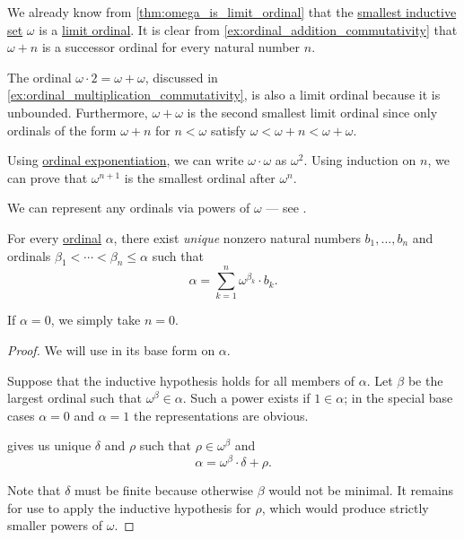 \begin{example}\label{ex:ordinal_polynomials}
  We already know from \cref{thm:omega_is_limit_ordinal} that the \hyperref[def:smallest_inductive_set]{smallest inductive set} \( \omega \) is a \hyperref[def:successor_and_limit_ordinal]{limit ordinal}. It is clear from \cref{ex:ordinal_addition_commutativity} that \( \omega + n \) is a successor ordinal for every natural number \( n \).

  The ordinal \( \omega \cdot 2 = \omega + \omega \), discussed in \cref{ex:ordinal_multiplication_commutativity}, is also a limit ordinal because it is unbounded. Furthermore, \( \omega + \omega \) is the second smallest limit ordinal since only ordinals of the form \( \omega + n \) for \( n < \omega \) satisfy \( \omega < \omega + n < \omega + \omega \).

  Using \hyperref[def:ordinal_exponentiation]{ordinal exponentiation}, we can write \( \omega \cdot \omega \) as \( \omega^2 \). Using induction on \( n \), we can prove that \( \omega^{n + 1} \) is the smallest ordinal after \( \omega^n \).

  We can represent any ordinals via powers of \( \omega \) --- see .
\end{example}

\begin{theorem}\label{thm:cantors_normal_form_theorem}
  For every \hyperref[def:ordinal]{ordinal} \( \alpha \), there exist \emph{unique} nonzero natural numbers \( b_1, \ldots, b_n \) and ordinals \( \beta_1 < \cdots < \beta_n \leq \alpha \) such that
  \begin{equation*}
    \alpha = \sum_{k=1}^n \omega^{\beta_k} \cdot b_k.
  \end{equation*}

  If \( \alpha = 0 \), we simply take \( n = 0 \).
\end{theorem}
\begin{proof}
  We will use  in its base form on \( \alpha \).

  Suppose that the inductive hypothesis holds for all members of \( \alpha \). Let \( \beta \) be the largest ordinal such that \( \omega^\beta \in \alpha \). Such a power exists if \( 1 \in \alpha \); in the special base cases \( \alpha = 0 \) and \( \alpha = 1 \) the representations are obvious.

   gives us unique \( \delta \) and \( \rho \) such that \( \rho \in \omega^\beta \) and
  \begin{equation*}
    \alpha = \omega^\beta \cdot \delta + \rho.
  \end{equation*}

  Note that \( \delta \) must be finite because otherwise \( \beta \) would not be minimal. It remains for use to apply the inductive hypothesis for \( \rho \), which would produce strictly smaller powers of \( \omega \).
\end{proof}

